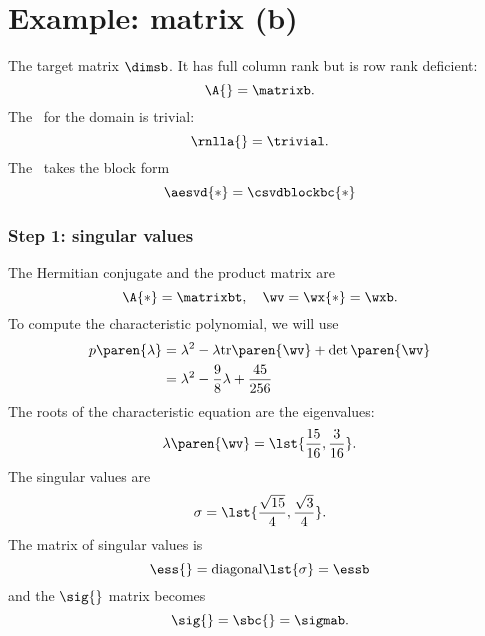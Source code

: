 \section{Example: matrix (b)}
\label{sec:svd I:b}
The target matrix $\dimsb$. It has full column rank but is row rank deficient:
\begin{equation}
  \A{} = \matrixb.
\end{equation}
The \ns \ for the domain is trivial:
\begin{equation}
  \rnlla{} = \trivial.
\end{equation}
The \asvd \ takes the block form
\begin{equation}
  \aesvd{*} = \csvdblockbc{*}
\end{equation}


\subsubsection{Step 1: singular values}
The Hermitian conjugate and the product matrix are
\begin{equation}
  \A{*} = \matrixbt, \quad \wv = \wx{*} = \wxb.
\end{equation}
To compute the characteristic polynomial, we will use
\begin{equation}
  \begin{split}
    p\paren{\lambda} 
      &= \lambda^{2} - \lambda \text{tr} \paren{\wv} + \det \paren{\wv} \\
      &= \lambda^{2} - \frac{9}{8}\lambda + \frac{45}{256}
  \end{split}
\end{equation}
The roots of the characteristic equation are the eigenvalues:
\begin{equation}
  \lambda \paren{\wv} = \lst{ \frac{15}{16}, \frac{3}{16} }. 
\end{equation}
The singular values are
\begin{equation}
  \sigma = \lst{ \frac{\sqrt{15}}{4}, \frac{\sqrt{3}}{4} }.
\end{equation}
The matrix of singular values is
\begin{equation}
  \ess{} = \text{diagonal} \lst{\sigma} = \essb
\end{equation}
and the $\sig{}$ matrix becomes
\begin{equation}
  \sig{} = \sbc{} = \sigmab.
\end{equation}


